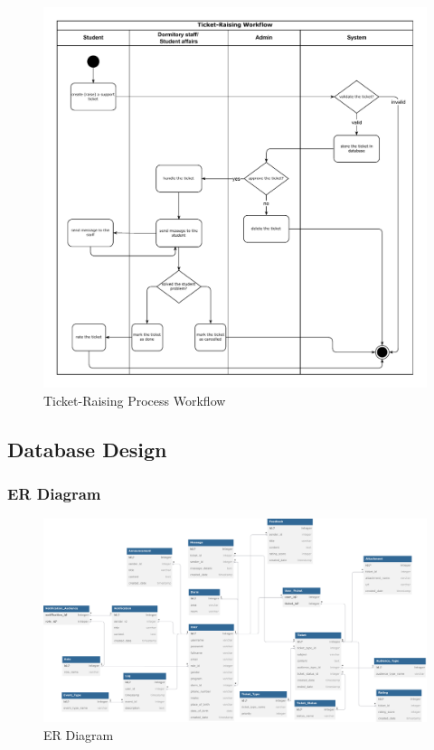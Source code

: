 \begin{figure}[H]
	\centering
	\includegraphics[width=0.84\columnwidth]{graphics/sys-workflow.pdf}
	\caption{Ticket-Raising Process Workflow}
	\label{fig:ticket-raising-workflow}
\end{figure}


\subsection{Database Design}
	\subsubsection{ER Diagram}
	\begin{figure}[H]
		\centering
		\includegraphics[width=1 \columnwidth]{graphics/er-diagram.pdf}
		\caption{ER Diagram}
		\label{fig:er-diagram}
	\end{figure}



